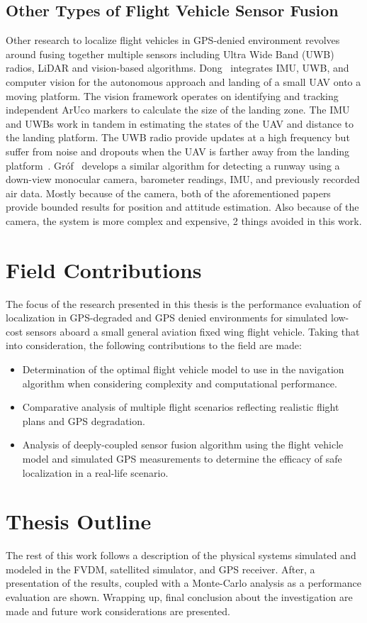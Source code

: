 \subsection{Other Types of Flight Vehicle Sensor Fusion}
Other research to localize flight vehicles in GPS-denied environment revolves around fusing together multiple sensors including Ultra Wide Band (UWB) radios, LiDAR and vision-based algorithms. Dong~\cite{dongIntegratedUWBIMUVisionFramework2022} integrates IMU, UWB, and computer vision for the autonomous approach and landing of a small UAV onto a moving platform. The vision framework operates on identifying and tracking independent ArUco markers to calculate the size of the landing zone. The IMU and UWBs work in tandem in estimating the states of the UAV and distance to the landing platform. The UWB radio provide updates at a high frequency but suffer from noise and dropouts when the UAV is farther away from the landing platform~\cite{dongIntegratedUWBIMUVisionFramework2022}. Gr\'of~\cite{grofPositioningAircraftRelative2022} develops a similar algorithm for detecting a runway using a down-view monocular camera, barometer readings, IMU, and previously recorded air data. Mostly because of the camera, both of the aforementioned papers provide bounded results for position and attitude estimation. Also because of the camera, the system is more complex and expensive, 2 things avoided in this work.

\section{Field Contributions}
The focus of the research presented in this thesis is the performance evaluation of localization in GPS-degraded and GPS denied environments for simulated low-cost sensors aboard a small general aviation fixed wing flight vehicle. Taking that into consideration, the following contributions to the field are made:
\begin{itemize}
    \item Determination of the optimal flight vehicle model to use in the navigation algorithm when considering complexity and computational performance.
    \item Comparative analysis of multiple flight scenarios reflecting realistic flight plans and GPS degradation.
    \item Analysis of deeply-coupled sensor fusion algorithm using the flight vehicle model and simulated GPS measurements to determine the efficacy of safe localization in a real-life scenario.
\end{itemize}

\section{Thesis Outline}
The rest of this work follows a description of the physical systems simulated and modeled in the FVDM, satellited simulator, and GPS receiver. After, a presentation of the results, coupled with a Monte-Carlo analysis as a performance evaluation are shown. Wrapping up, final conclusion about the investigation are made and future work considerations are presented.